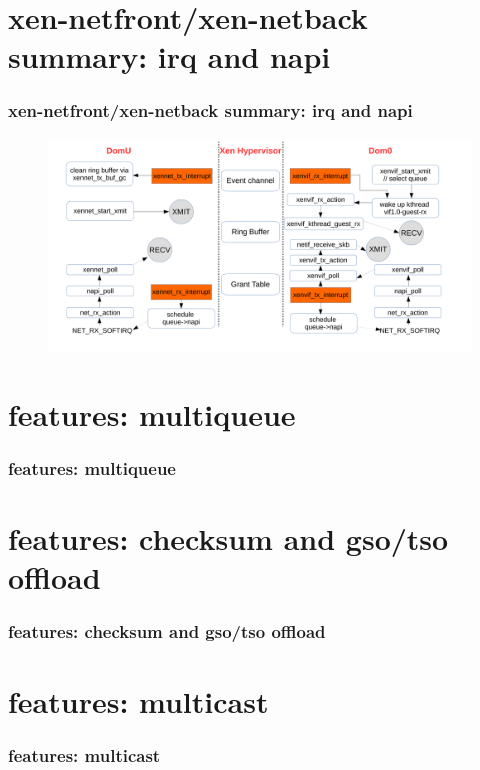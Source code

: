 \documentclass[aspectratio=169]{beamer}
\begin{document}

\section{xen-netfront/xen-netback summary: irq and napi}
\begin{frame}
\frametitle{xen-netfront/xen-netback summary: irq and napi}
\begin{figure}
\includegraphics[width=1.0\linewidth]{figures/irq_napi.pdf}
\end{figure}
\end{frame}


\section{features: multiqueue}
\begin{frame}
\frametitle{features: multiqueue}
\end{frame}


\section{features: checksum and gso/tso offload}
\begin{frame}
\frametitle{features: checksum and gso/tso offload}
\end{frame}


\section{features: multicast}
\begin{frame}
\frametitle{features: multicast}
\end{frame}
\end{document}
